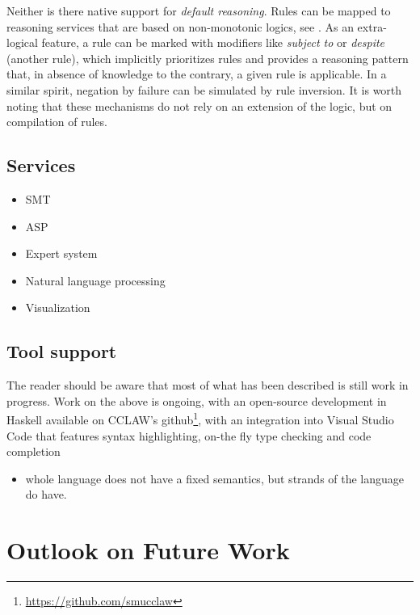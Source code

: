 \documentclass[runningheads]{llncs}
\begin{document}
Neither is there native support for \emph{default reasoning}. Rules can be
mapped to reasoning services that are based on non-monotonic logics, see
. As an extra-logical feature, a rule can be marked with
modifiers like \emph{subject to} or \emph{despite} (another rule), which
implicitly prioritizes rules and provides a reasoning pattern that, in absence
of knowledge to the contrary, a given rule is applicable. In a similar spirit,
negation by failure can be simulated by rule inversion. It is worth noting
that these mechanisms do not rely on an extension of the logic, but on
compilation of rules.

\subsection{Services}\label{sec:services}

\begin{itemize}
\item SMT
\item ASP
\item Expert system
\item Natural language processing
\item Visualization
\end{itemize}

\subsection{Tool support}\label{sec:tool_support}


The reader should be aware that most of what has been described is still work
in progress. Work on the above is ongoing, with an open-source development in
Haskell available on CCLAW's
github\footnote{\url{https://github.com/smucclaw}}, with an integration into
Visual Studio Code that features syntax highlighting, on-the fly type checking
and code completion 

\begin{itemize}
\item whole language does not have a fixed semantics, but strands of the
  language do have.
\end{itemize}

\section{Outlook on Future Work}\label{sec:outlook}
\end{document}
